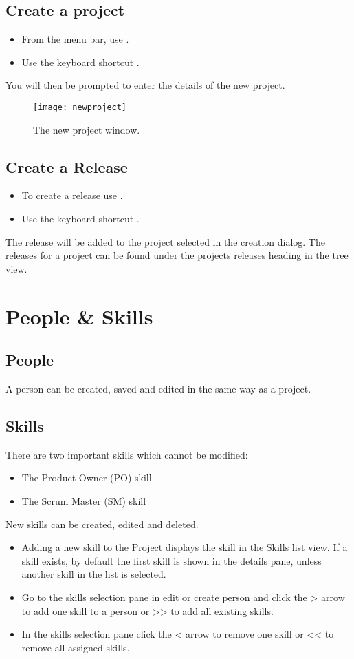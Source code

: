 \documentclass[11pt,fleqn]{book} %
\begin{document}
\subsection{Create a project}
    \begin{itemize}
        \item From the menu bar, use .
        \item Use the keyboard shortcut .
    \end{itemize}
    You will then be prompted to enter the details of the new project.

    \begin{figure}[h]
        \centering
        \texttt{[image: newproject]}
        \caption{The new project window.\label{newproject}}
    \end{figure}

\subsection{Create a Release}
    \begin{itemize}
        \item To create a release use .
        \item Use the keyboard shortcut .
    \end{itemize}
    The release will be added to the project selected in the creation dialog.
    The releases for a project can be found under the projects releases heading in the tree view.

\section{People \& Skills}
\subsection{People}
A person can be created, saved and edited in the same way as a project.
\subsection{Skills}
There are two important skills which cannot be modified: 
\begin{itemize}
  \item The Product Owner (PO) skill
  \item The Scrum Master (SM) skill
\end{itemize}
New skills can be created, edited and deleted.
\begin{itemize}
  \item Adding a new skill to the Project displays the skill in the Skills list view. If a skill exists, by default the
  first skill is shown in the details pane, unless another skill in the list is selected.
  \item Go to the skills selection pane in edit or create person and click the > arrow to add one skill to a person
  or >> to add all existing skills.
  \item In the skills selection pane click the < arrow to remove one skill or << to remove all assigned skills.
\end{itemize}
\end{document}
